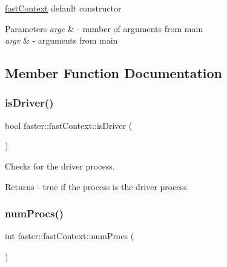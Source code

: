 \hyperlink{classfaster_1_1fastContext}{fast\+Context} default constructor 


\begin{DoxyParams}{Parameters}
{\em argc} & -\/ number of arguments from main \\
\hline
{\em argv} & -\/ arguments from main \\
\hline
\end{DoxyParams}


\subsection{Member Function Documentation}
\hypertarget{classfaster_1_1fastContext_a4c4b1bc0cfe9f4e4a7959cc176d2ec24}{}\label{classfaster_1_1fastContext_a4c4b1bc0cfe9f4e4a7959cc176d2ec24} 
\subsubsection{\texorpdfstring{is\+Driver()}{isDriver()}}
{\footnotesize\ttfamily bool faster\+::fast\+Context\+::is\+Driver (\begin{DoxyParamCaption}{ }\end{DoxyParamCaption})}



Checks for the driver process. 

\begin{DoxyReturn}{Returns}
-\/ true if the process is the driver process 
\end{DoxyReturn}
\hypertarget{classfaster_1_1fastContext_a287bc160898c677df176de122d9dfad9}{}\label{classfaster_1_1fastContext_a287bc160898c677df176de122d9dfad9} 
\subsubsection{\texorpdfstring{num\+Procs()}{numProcs()}}
{\footnotesize\ttfamily int faster\+::fast\+Context\+::num\+Procs (\begin{DoxyParamCaption}{ }\end{DoxyParamCaption})\hspace{0.3cm}{\ttfamily [inline]}}



